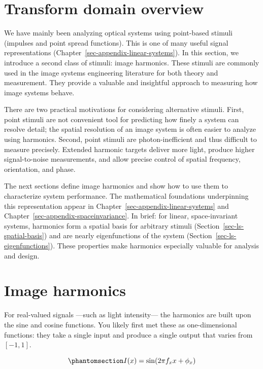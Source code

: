 \documentclass[
  letterpaper,
]{book}
\begin{document}
\section{Transform domain
overview}\label{sec-optics-linear-harmonics-overview}

We have mainly been analyzing optical systems using point-based stimuli
(impulses and point spread functions). This is one of many useful signal
representations (Chapter~\ref{sec-appendix-linear-systems}). In this
section, we introduce a second class of stimuli: image harmonics. These
stimuli are commonly used in the image systems engineering literature
for both theory and measurement. They provide a valuable and insightful
approach to measuring how image systems behave.

There are two practical motivations for considering alternative stimuli.
First, point stimuli are not convenient tool for predicting how finely a
system can resolve detail; the spatial resolution of an image system is
often easier to analyze using harmonics. Second, point stimuli are
photon-inefficient and thus difficult to measure precisely. Extended
harmonic targets deliver more light, produce higher signal-to-noise
measurements, and allow precise control of spatial frequency,
orientation, and phase.

The next sections define image harmonics and show how to use them to
characterize system performance. The mathematical foundations
underpinning this representation appear in
Chapter~\ref{sec-appendix-linear-systems} and
Chapter~\ref{sec-appendix-spaceinvariance}. In brief: for linear,
space-invariant systems, harmonics form a spatial basis for arbitrary
stimuli (Section~\ref{sec-ls-spatial-basis}) and are nearly
eigenfunctions of the system (Section~\ref{sec-ls-eigenfunctions}).
These properties make harmonics especially valuable for analysis and
design.

\section{Image harmonics}\label{sec-optics-harmonics}

For real-valued signals ---such as light intensity--- the harmonics are
built upon the sine and cosine functions. You likely first met these as
one-dimensional functions: they take a single input and produce a single
output that varies from \([-1,1]\).

\begin{equation}\phantomsection\label{eq-harmonics-1d}{
I(x) = \sin(2\pi f_x x + \phi_x)
}\end{equation}
\end{document}
